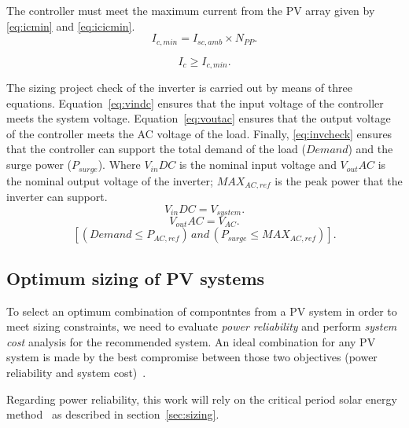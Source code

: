 \documentclass[10pt,conference]{IEEEtran}
\begin{document}
The controller must meet the maximum current from the PV array given by \eqref{eq:icmin} and \eqref{eq:icicmin}.
\begin{equation}
\label{eq:icmin}
\scriptstyle I_{c,min} = \scriptstyle I_{sc,amb} \times \scriptstyle N_{PP}.
\end{equation}

\begin{equation}
\label{eq:icicmin}
\scriptstyle I_{c} \geq \scriptstyle I_{c,min}.
\end{equation}

The sizing project check of the inverter is carried out by means of three equations. Equation~\eqref{eq:vindc} ensures that the input voltage of the controller meets the system voltage. Equation~\eqref{eq:voutac} ensures that the output voltage of the controller meets the AC voltage of the load. Finally, \eqref{eq:invcheck} ensures that the controller can support the total demand of the load ($Demand$) and the surge power ($P_{surge}$). Where $V_{in}DC$ is the nominal input voltage and $V_{out}AC$ is the nominal output voltage of the inverter; $MAX_{AC,ref}$ is the peak power that the inverter can support.
%
\begin{equation}
\label{eq:vindc} 
\scriptstyle V_{in}DC = \scriptstyle V_{system}.
\end{equation}
%
\begin{equation}
\label{eq:voutac} 
\scriptstyle V_{out}AC = \scriptstyle V_{AC}.
\end{equation}
%
\begin{equation}
\label{eq:invcheck} 
\left[ (\scriptstyle Demand \leq \scriptstyle P_{AC,ref}) \, \scriptstyle and \, \scriptstyle (P_{surge} \leq MAX_{AC,ref}) \right].
\end{equation}
\subsection{Optimum sizing of PV systems}
To select an optimum combination of compontntes from a PV system in order to meet sizing constraints, we need to evaluate \textit{power reliability} and perform \textit{system cost} analysis for the recommended system. An ideal combination for any PV system is made by the best compromise between those two objectives (power reliability and system cost)~\cite{Alsadi2018}. 

Regarding power reliability, this work will rely on the critical period solar energy method~\cite{Pinho} as described in section~\ref{sec:sizing}.
\end{document}
